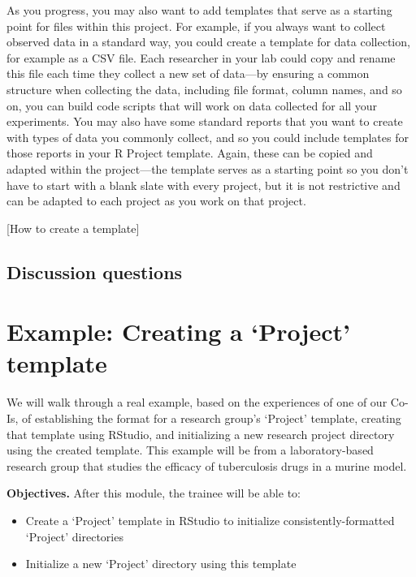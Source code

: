 \documentclass[]{tufte-book}
\providecommand{\tightlist}{%
  \setlength{\itemsep}{0pt}\setlength{\parskip}{0pt}}
\begin{document}
As you progress, you may also want to add templates that serve as a starting point
for files within this project. For example, if you always want to collect
observed data in a standard way, you could create a template for data collection,
for example as a CSV file. Each researcher in your lab could copy and rename this
file each time they collect a new set of data---by ensuring a common structure
when collecting the data, including file format, column names, and so on, you can
build code scripts that will work on data collected for all your experiments. You
may also have some standard reports that you want to create with types of data
you commonly collect, and so you could include templates for those reports in your
R Project template. Again, these can be copied and adapted within the project---the
template serves as a starting point so you don't have to start with a blank slate
with every project, but it is not restrictive and can be adapted to each project
as you work on that project.

{[}How to create a template{]}

\hypertarget{discussion-questions}{%
\subsection{Discussion questions}\label{discussion-questions}}

\hypertarget{example-creating-a-project-template}{%
\section{Example: Creating a `Project' template}\label{example-creating-a-project-template}}

We will walk through a real example, based on the experiences of one of our
Co-Is, of establishing the format for a research group's `Project' template,
creating that template using RStudio, and initializing a new research project
directory using the created template. This example will be from a
laboratory-based research group that studies the efficacy of tuberculosis drugs
in a murine model.

\textbf{Objectives.} After this module, the trainee will be able to:

\begin{itemize}
\tightlist
\item
  Create a `Project' template in RStudio to initialize consistently-formatted
  `Project' directories
\item
  Initialize a new `Project' directory using this template
\end{itemize}
\end{document}
